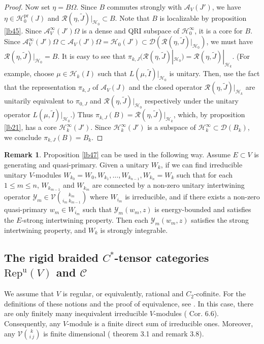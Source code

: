 \documentclass[12pt,a4paper]{article}
\theoremstyle{definition}
\newtheorem{rem}[df]{Remark}
\theoremstyle{plain}
\newcommand{\mc}{\mathcal}
\newcommand{\wtd}{\widetilde}
\newcommand{\Dom}{\scr D}
\newcommand{\scr}{\mathscr}
\newcommand{\RepuV}{\mathrm{Rep}^{\mathrm u}(V)}
\newcommand{\pr}{\mathrm{pr}}
\numberwithin{equation}{subsection}
\begin{document}
\begin{proof}
Now set $\eta=B\Omega$. Since $B$ commutes strongly with $\mc A_V(J')$, we have $\eta\in\mc H_0^\pr(J)$ and $\scr R(\eta,\wtd J)|_{\mc H_0}\subset B$. Note that $B$ is localizable by proposition \ref{lb45}. Since $\mc A_V^\infty(J')\Omega$ is a dense and QRI subspace of $\mc H_0^\infty$, it is a core for $B$. Since $\mc A_V^\infty(J')\Omega\subset \mc A_V(J')\Omega=\mc H_0(J')\subset\Dom(\scr R(\eta,\wtd J)|_{\mc H_0})$,  we must have $\scr R(\eta,\wtd J)|_{\mc H_0}=B$. It is easy to see that $\pi_{k,J}(\scr R(\eta,\wtd J)|_{\mc H_0})=\scr R(\eta,\wtd J)|_{\mc H_k}$. (For example,  choose $\mu\in\mc H_k(I)$ such that $L(\mu,\wtd I)|_{\mc H_0}$ is unitary. Then, use the fact that the representation $\pi_{k,J}$ of $\mc A_V(J)$ and the closed operator $\scr R(\eta,\wtd J)|_{\mc H_k}$ are unitarily equivalent  to $\pi_{0,J}$ and $\scr R(\eta,\wtd J)|_{\mc H_0}$ respectively under the unitary operator $L(\mu,\wtd I)|_{\mc H_0}$.) Thus $\pi_{k,J}(B)=\scr R(\eta,\wtd J)|_{\mc H_k}$, which, by proposition \ref{lb21}, has a core $\mc H_k^\infty(J')$. Since  $\mc H_k^\infty(J')$ is a subspace of $\mc H_k^\infty\subset\Dom(B_k)$, we conclude $\pi_{k,J}(B)=B_k$.
\end{proof}




\begin{rem}\label{lb50}
Proposition \ref{lb47} can be used in the following way. Assume $E\subset V$ is generating and quasi-primary. Given a unitary $W_k$, if we can find irreducible unitary $V$-modules $W_{k_0}=W_0,W_{k_1},\dots,W_{k_{n-1}},W_{k_n}=W_k$ such that for each $1\leq m\leq n$, $W_{k_{m-1}}$ and $W_{k_m}$ are connected by a non-zero unitary intertwining operator $\mc Y_m\in\mc V{k_m\choose {i_m}~k_{m-1}}$ where $W_{i_m}$ is irreducible, and if there exists a non-zero quasi-primary $w_m\in W_{i_m}$ such that $\mc Y_m(w_m,z)$ is energy-bounded and satisfies the $E$-strong intertwining property. Then each  $\mc Y_m(w_m,z)$ satisfies the strong intertwining property, and $W_k$ is strongly integrable.
\end{rem}





\subsection{The rigid braided $C^*$-tensor categories $\RepuV$ and $\scr C$}\label{lb87}


We assume that $V$ is regular, or equivalently, rational and $C_2$-cofinite. For the definitions of these notions and the proof of equivalence, see \cite{ABD04}. In this case, there are only finitely many inequivalent irreducible $V$-modules (\cite{Hua05b} Cor. 6.6). Consequently, any $V$-module is a finite direct sum of irreducible ones. Moreover, any $\mc V{k\choose i~j}$ is finite dimensional (\cite{Hua05a} theorem 3.1 and remark 3.8). 
\end{document}
